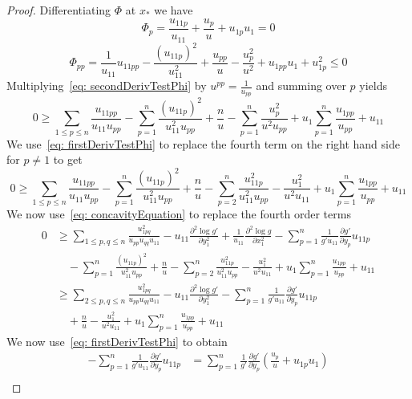 \documentclass[12pt,reqno]{amsart}
\newcommand{\del}{\partial}
\numberwithin{equation}{section}
\begin{document}
\begin{proof}
Differentiating $\Phi$ at $x_*$ we have
\begin{equation}\label{eq: firstDerivTestPhi}
\Phi_{p} = \frac{u_{11p}}{u_{11}} + \frac{u_p}{u} + u_{1p}u_1=0
\end{equation}
\begin{equation}\label{eq: secondDerivTestPhi}
 \Phi_{pp} = \frac{1}{u_{11}}u_{11pp}-\frac{(u_{11p})^2}{u_{11}^2} + \frac{u_{pp}}{u} - \frac{u_p^2}{u^2} + u_{1pp}u_1 + u_{1p}^2 \leq0
\end{equation}
Multiplying~\eqref{eq: secondDerivTestPhi} by $u^{pp}= \frac{1}{u_{pp}}$ and summing over $p$ yields
\[
0 \geq \sum_{1\leq p\leq n} \frac{u_{11pp}}{u_{11}u_{pp}}-\sum_{p=1}^{n}\frac{(u_{11p})^2}{u_{11}^2u_{pp}} + \frac{n}{u} - \sum_{p=1}^{n}\frac{u_p^2}{u^2u_{pp}} + u_{1}\sum_{p=1}^{n}\frac{u_{1pp}}{u_{pp}} + u_{11} 
\]
We use~\eqref{eq: firstDerivTestPhi} to replace the fourth term on the right hand side for $p\ne 1$ to get
\[
0 \geq \sum_{1\leq p\leq n} \frac{u_{11pp}}{u_{11}u_{pp}}-\sum_{p=1}^{n}\frac{(u_{11p})^2}{u_{11}^2u_{pp}} + \frac{n}{u} - \sum_{p=2}^{n}\frac{u_{11p}^2}{u_{11}^2u_{pp}}-\frac{u_1^2}{u^2u_{11}} + u_{1}\sum_{p=1}^{n}\frac{u_{1pp}}{u_{pp}} + u_{11}
\]
We now use~\eqref{eq: concavityEquation} to replace the fourth order terms
\begin{equation}\label{eq: PogorelovInequality1}
\begin{aligned}
  0 &\geq \sum_{1 \leq p,q\leq n}\frac{u_{1pq}^2} {u_{pp}u_{qq}u_{11}}-u_{11}\frac{\del^2 \log g'}{\del y_1^2}+\frac{1}{u_{11}}\frac{\del^2\log g}{\del x_1^2} -\sum_{p=1}^{n}\frac{1}{g'u_{11}}\frac{\del g'}{\del y_p}u_{11p} \\
  &\quad -\sum_{p=1}^{n}\frac{(u_{11p})^2}{u_{11}^2u_{pp}} + \frac{n}{u} - \sum_{p=2}^{n}\frac{u_{11p}^2}{u_{11}^2u_{pp}}-\frac{u_1^2}{u^2u_{11}} + u_{1}\sum_{p=1}^{n}\frac{u_{1pp}}{u_{pp}} + u_{11}\\
  &\geq \sum_{2 \leq p,q\leq n}\frac{u_{1pq}^2} {u_{pp}u_{qq}u_{11}}-u_{11}\frac{\del^2 \log g'}{\del y_1^2} -\sum_{p=1}^{n}\frac{1}{g'u_{11}}\frac{\del g'}{\del y_p}u_{11p} \\
  &\quad + \frac{n}{u} -\frac{u_1^2}{u^2u_{11}} + u_{1}\sum_{p=1}^{n}\frac{u_{1pp}}{u_{pp}} + u_{11}
\end{aligned}
\end{equation}
We now use~\eqref{eq: firstDerivTestPhi} to obtain
\[
\begin{aligned}
-\sum_{p=1}^{n}\frac{1}{g'u_{11}}\frac{\del g'}{\del y_p}u_{11p} &= \sum_{p=1}^{n}\frac{1}{g'}\frac{\del g'}{\del y_p}\left(\frac{u_{p}}{u}+u_{1p}u_1\right)\\

\end{aligned}\]
\end{proof}
\end{document}
